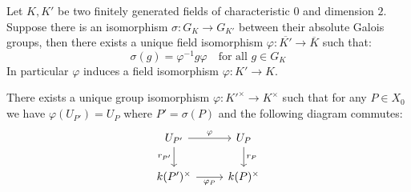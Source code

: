 \begin{theorem}\label{1.1}
Let $K,K'$ be two finitely generated fields of characteristic $0$ and dimension $2$. Suppose there is an isomorphism $\sigma:G_K\to G_{K'}$ between their absolute Galois groups, then there exists a unique field isomorphism $\varphi:\overline{K'}\to\overline{K}$ such that:
\[\sigma(g)=\varphi^{-1}g\varphi\quad \text{for all }g\in G_K\] 
In particular $\varphi$ induces a field isomorphism $\varphi:K'\to K$.
\end{theorem}

\begin{step}
There exists a unique group isomorphism $\varphi:K'^\times\to K^\times$ such that for any $P\in X_0$ we have $\varphi(U_{P'})=U_P$ where $P'=\sigma(P)$ and the following diagram commutes:
\[ \begin{tikzcd}
U_{P'} \ar[r, "\varphi"]\ar[d, "r_{P'}"'] & U_P \ar[d, "r_P"]\\
k(P')^\times \ar[r, "\varphi_P"'] & k(P)^\times
\end{tikzcd} \]
\end{step}

